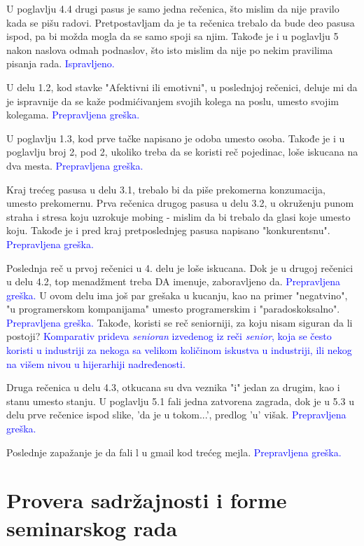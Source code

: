 \documentclass[a4paper]{report}
\newcommand{\odgovor}[1]{\textcolor{blue}{#1}}
\begin{document}
U poglavlju 4.4 drugi pasus je samo jedna rečenica, što mislim da nije pravilo kada se pišu radovi. Pretpostavljam da je ta rečenica trebalo da bude deo pasusa ispod, pa bi možda mogla da se samo spoji sa njim. Takođe je i u poglavlju 5 nakon naslova odmah podnaslov, što isto mislim da nije po nekim pravilima pisanja rada. \odgovor{Ispravljeno.}

U delu 1.2, kod stavke "Afektivni ili emotivni", u poslednjoj rečenici, deluje mi da je ispravnije da se kaže podmićivanjem svojih kolega na poslu, umesto svojim kolegama. \odgovor{Prepravljena greška.}

U poglavlju 1.3, kod prve tačke napisano je odoba umesto osoba. Takođe je i u poglavlju broj 2, pod 2, ukoliko treba da se koristi reč pojedinac, loše iskucana na dva mesta. \odgovor{Prepravljena greška.}

Kraj trećeg pasusa u delu 3.1, trebalo bi da piše prekomerna konzumacija, umesto prekomernu. Prva rečenica drugog pasusa u delu 3.2, u okruženju punom straha i stresa koju uzrokuje mobing - mislim da bi trebalo da glasi koje umesto koju. Takođe je i pred kraj pretposlednjeg pasusa napisano "konkurentsnu". \odgovor{Prepravljena greška.}

Poslednja reč u prvoj rečenici u 4. delu je loše iskucana. Dok je u drugoj rečenici u delu 4.2, top menadžment treba DA imenuje, zaboravljeno da. \odgovor{Prepravljena greška.} U ovom delu ima još par grešaka u kucanju, kao na primer "negatvino", "u programerskom kompanijama" umesto programerskim i "paradoskoksalno". \odgovor{Prepravljena greška.} Takođe, koristi se reč seniorniji, za koju nisam siguran da li postoji? \odgovor{Komparativ prideva \textit{senioran} izvedenog iz reči \textit{senior}, koja se često koristi u industriji za nekoga sa velikom količinom iskustva u industriji, ili nekog na višem nivou u hijerarhiji nadređenosti.}

Druga rečenica u delu 4.3, otkucana su dva veznika "i" jedan za drugim, kao i stanu umesto stanju. U poglavlju 5.1 fali jedna zatvorena zagrada, dok je u 5.3 u delu prve rečenice ispod slike, 'da je u tokom...', predlog 'u' višak. \odgovor{Prepravljena greška.}

Poslednje zapažanje je da fali l u gmail kod trećeg mejla. \odgovor{Prepravljena greška.}


\section{Provera sadržajnosti i forme seminarskog rada}
\end{document}
